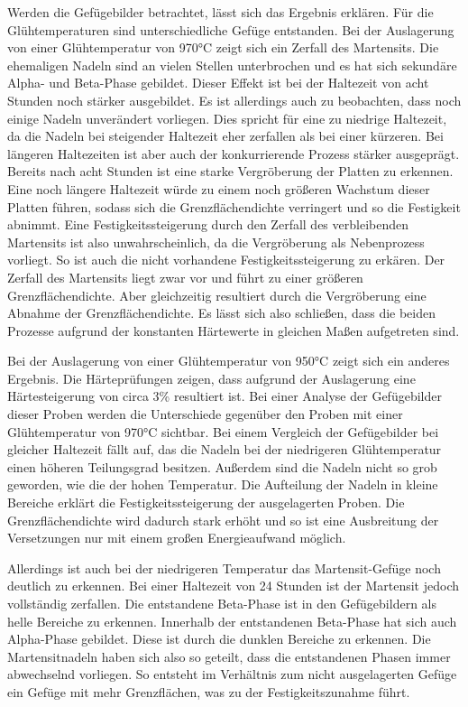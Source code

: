 \documentclass[a4paper, 11pt]{tubsreprt}
\begin{document}
Werden die Gefügebilder betrachtet, lässt sich das Ergebnis erklären. Für die Glühtemperaturen sind unterschiedliche Gefüge entstanden. Bei der Auslagerung von einer Glühtemperatur von 970°C zeigt sich ein Zerfall des Martensits. Die ehemaligen Nadeln sind an vielen Stellen unterbrochen und es hat sich sekundäre Alpha- und Beta-Phase gebildet. Dieser Effekt ist bei der Haltezeit von acht Stunden noch stärker ausgebildet. Es ist allerdings auch zu beobachten, dass noch einige Nadeln unverändert vorliegen. Dies spricht für eine zu niedrige Haltezeit, da die Nadeln bei steigender Haltezeit eher zerfallen als bei einer kürzeren. Bei längeren Haltezeiten ist aber auch der konkurrierende Prozess stärker ausgeprägt. Bereits nach acht Stunden ist eine starke Vergröberung der Platten zu erkennen. Eine noch längere Haltezeit würde zu einem noch größeren Wachstum dieser Platten führen, sodass sich die Grenzflächendichte verringert und so die Festigkeit abnimmt. Eine Festigkeitssteigerung durch den Zerfall des verbleibenden Martensits ist also unwahrscheinlich, da die Vergröberung als Nebenprozess vorliegt. So ist auch die nicht vorhandene Festigkeitssteigerung zu erkären. Der Zerfall des Martensits liegt zwar vor und führt zu einer größeren Grenzflächendichte. Aber gleichzeitig resultiert durch die Vergröberung eine Abnahme der Grenzflächendichte. Es lässt sich also schließen, dass die beiden Prozesse aufgrund der konstanten Härtewerte in gleichen Maßen aufgetreten sind. 

Bei der Auslagerung von einer Glühtemperatur von 950°C zeigt sich ein anderes Ergebnis. Die Härteprüfungen zeigen, dass aufgrund der Auslagerung eine Härtesteigerung von circa 3\%  resultiert ist. Bei einer  Analyse der Gefügebilder dieser Proben werden die Unterschiede gegenüber den Proben mit einer Glühtemperatur von 970°C sichtbar. Bei einem Vergleich der Gefügebilder bei gleicher Haltezeit fällt auf, das die Nadeln bei der niedrigeren Glühtemperatur einen höheren Teilungsgrad besitzen. Außerdem sind die Nadeln nicht so grob geworden, wie die der hohen Temperatur. Die Aufteilung der Nadeln in kleine Bereiche erklärt die Festigkeitssteigerung der ausgelagerten Proben. Die Grenzflächendichte wird dadurch stark erhöht und so ist eine Ausbreitung der Versetzungen nur mit einem großen Energieaufwand möglich. 

Allerdings ist auch bei der niedrigeren Temperatur das Martensit-Gefüge noch deutlich zu erkennen. Bei einer Haltezeit von 24 Stunden ist der Martensit jedoch vollständig zerfallen. Die entstandene Beta-Phase ist in den Gefügebildern als helle Bereiche zu erkennen. Innerhalb der entstandenen Beta-Phase hat sich auch Alpha-Phase gebildet. Diese ist durch die dunklen Bereiche zu erkennen. Die Martensitnadeln haben sich also so geteilt, dass die entstandenen Phasen immer abwechselnd vorliegen. So entsteht im Verhältnis zum nicht ausgelagerten Gefüge ein Gefüge mit mehr Grenzflächen, was zu der Festigkeitszunahme führt.
\end{document}

